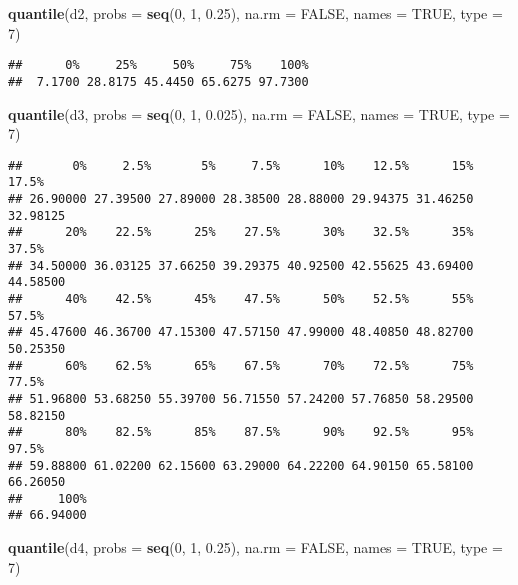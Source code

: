 \documentclass[
]{article}
\newenvironment{Shaded}{\begin{snugshade}}{\end{snugshade}}
\newcommand{\AttributeTok}[1]{\textcolor[rgb]{0.13,0.29,0.53}{#1}}
\newcommand{\ConstantTok}[1]{\textcolor[rgb]{0.56,0.35,0.01}{#1}}
\newcommand{\DecValTok}[1]{\textcolor[rgb]{0.00,0.00,0.81}{#1}}
\newcommand{\FloatTok}[1]{\textcolor[rgb]{0.00,0.00,0.81}{#1}}
\newcommand{\FunctionTok}[1]{\textcolor[rgb]{0.13,0.29,0.53}{\textbf{#1}}}
\newcommand{\NormalTok}[1]{#1}
\begin{document}
\begin{Shaded}
\begin{Highlighting}[]
\FunctionTok{quantile}\NormalTok{(d2, }\AttributeTok{probs =} \FunctionTok{seq}\NormalTok{(}\DecValTok{0}\NormalTok{, }\DecValTok{1}\NormalTok{, }\FloatTok{0.25}\NormalTok{), }\AttributeTok{na.rm =} \ConstantTok{FALSE}\NormalTok{, }\AttributeTok{names =} \ConstantTok{TRUE}\NormalTok{, }\AttributeTok{type =} \DecValTok{7}\NormalTok{)}
\end{Highlighting}
\end{Shaded}

\begin{verbatim}
##      0%     25%     50%     75%    100% 
##  7.1700 28.8175 45.4450 65.6275 97.7300
\end{verbatim}

\begin{Shaded}
\begin{Highlighting}[]
\FunctionTok{quantile}\NormalTok{(d3, }\AttributeTok{probs =} \FunctionTok{seq}\NormalTok{(}\DecValTok{0}\NormalTok{, }\DecValTok{1}\NormalTok{, }\FloatTok{0.025}\NormalTok{), }\AttributeTok{na.rm =} \ConstantTok{FALSE}\NormalTok{, }\AttributeTok{names =} \ConstantTok{TRUE}\NormalTok{, }\AttributeTok{type =} \DecValTok{7}\NormalTok{)}
\end{Highlighting}
\end{Shaded}

\begin{verbatim}
##       0%     2.5%       5%     7.5%      10%    12.5%      15%    17.5% 
## 26.90000 27.39500 27.89000 28.38500 28.88000 29.94375 31.46250 32.98125 
##      20%    22.5%      25%    27.5%      30%    32.5%      35%    37.5% 
## 34.50000 36.03125 37.66250 39.29375 40.92500 42.55625 43.69400 44.58500 
##      40%    42.5%      45%    47.5%      50%    52.5%      55%    57.5% 
## 45.47600 46.36700 47.15300 47.57150 47.99000 48.40850 48.82700 50.25350 
##      60%    62.5%      65%    67.5%      70%    72.5%      75%    77.5% 
## 51.96800 53.68250 55.39700 56.71550 57.24200 57.76850 58.29500 58.82150 
##      80%    82.5%      85%    87.5%      90%    92.5%      95%    97.5% 
## 59.88800 61.02200 62.15600 63.29000 64.22200 64.90150 65.58100 66.26050 
##     100% 
## 66.94000
\end{verbatim}

\begin{Shaded}
\begin{Highlighting}[]
\FunctionTok{quantile}\NormalTok{(d4, }\AttributeTok{probs =} \FunctionTok{seq}\NormalTok{(}\DecValTok{0}\NormalTok{, }\DecValTok{1}\NormalTok{, }\FloatTok{0.25}\NormalTok{), }\AttributeTok{na.rm =} \ConstantTok{FALSE}\NormalTok{, }\AttributeTok{names =} \ConstantTok{TRUE}\NormalTok{, }\AttributeTok{type =} \DecValTok{7}\NormalTok{)}
\end{Highlighting}
\end{Shaded}
\end{document}
